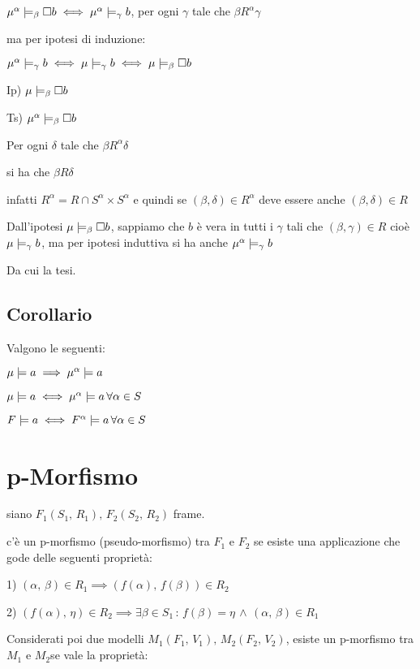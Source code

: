 $\mu^{\alpha}\models_{\beta}\square b\iff\mu^{\alpha}\models_{\gamma}b$,
per ogni $\gamma$ tale che $\beta R^{\alpha}\gamma$

ma per ipotesi di induzione:

$\mu^{\alpha}\models_{\gamma}b\iff\mu\models_{\gamma}b\iff\mu\models_{\beta}\square b$

Ip) $\mu\models_{\beta}\square b$

Ts) $\mu^{\alpha}\models_{\beta}\square b$

Per ogni $\delta$ tale che $\beta R^{\alpha}\delta$

si ha che $\beta R\delta$

infatti $R^{\alpha}=R\cap S^{\alpha}\times S^{\alpha}$ e quindi se
$(\beta,\delta)\in R^{\alpha}$ deve essere anche $(\beta,\delta)\in R$

Dall'ipotesi $\mu\models_{\beta}\square b$, sappiamo che $b$ è vera
in tutti i $\gamma$ tali che $(\beta,\gamma)\in R$ cioè $\mu\models_{\gamma}b$,
ma per ipotesi induttiva si ha anche $\mu^{\alpha}\models_{\gamma}b$

Da cui la tesi.


\subsection{Corollario}

Valgono le seguenti:

$\mu\models a\implies\mu^{\alpha}\models a$

$\mu\models a\iff\mu^{\alpha}\models a\,\forall\alpha\in S$

$F\models a\iff F^{\alpha}\models a\,\forall\alpha\in S$


\section{p-Morfismo}

siano $F_{1}(S_{1},\, R_{1}),\, F_{2}(S_{2},\, R_{2})$ frame.

c'è un p-morfismo (pseudo-morfismo) tra $F_{1}$ e $F_{2}$ se esiste
una applicazione che gode delle seguenti proprietà:

1) $(\alpha,\,\beta)\in R_{1}\implies(f(\alpha),\, f(\beta))\in R_{2}$

2) $(f(\alpha),\,\eta)\in R_{2}\implies\exists\beta\in S_{1}\,:\, f(\beta)=\eta\,\wedge\,(\alpha,\,\beta)\in R_{1}$

Considerati poi due modelli $M_{1}(F_{1},\, V_{1}),\, M_{2}(F_{2},\, V_{2})$,
esiste un p-morfismo tra $M_{1}$ e $M_{2}$se vale la proprietà:

